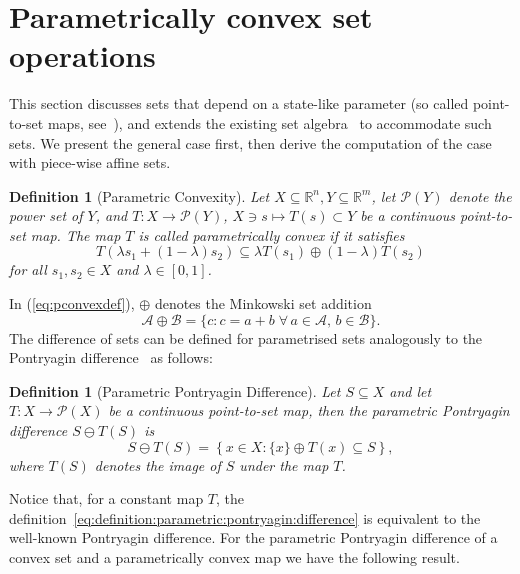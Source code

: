 \documentclass[letterpaper, 10pt, conference]{ieeeconf} %
\newtheorem{defn}[thm]{Definition}
\begin{document}
\section{Parametrically convex set operations}\label{sec:parametrically:convex:set:operations}
This section discusses sets that depend on a state-like parameter (so called point-to-set maps, 
see~\cite{Hogan:1973}), and extends the existing set algebra~\cite{blanchini:2007} to 
accommodate such sets. We present the general case first, then derive the computation of
the case with piece-wise affine sets.
%
%
    \begin{defn}[Parametric Convexity]\label{def:parametric:convexity}
      Let $X\subseteq\mathbb R^n, Y\subseteq\mathbb R^m$, let $\mathcal P(Y)$ denote the power set of $Y$, 
      and $T:X\rightarrow \mathcal P(Y)$, $X\ni s\mapsto T(s)\subset Y$ be a 
      continuous point-to-set map. The map $T$ is called \emph{parametrically convex} if it satisfies
      \begin{equation}\label{eq:pconvexdef}
        T(\lambda s_1 + (1-\lambda)s_2)\subseteq\lambda T(s_1) \oplus (1-\lambda) T(s_2)
      \end{equation}
      for all $s_1,s_2\in X$ and $\lambda\in[0,1]$.
    \end{defn}
%
In (\ref{eq:pconvexdef}), $\oplus$ denotes the Minkowski set addition
      \begin{equation}
        \mathcal A\oplus\mathcal B = \{c : c = a + b\; \forall\,a\in\mathcal A,\, b\in\mathcal B\}.
      \end{equation}
%
The difference of sets can be defined for parametrised sets analogously to the Pontryagin difference~\cite{Kolmanovsky:1998} as follows:
%
    \begin{defn}[Parametric Pontryagin Difference]\label{def:parametric:pontryagin:difference}
Let $S\subseteq X$ and let $T:X\to\mathcal P(X)$ be a continuous point-to-set map,
then the \emph{parametric Pontryagin difference} $S\ominus T(S)$ is 
      \begin{equation}\label{eq:definition:parametric:pontryagin:difference}
        S\ominus T(S) = \left\{x\in X: \{x\} \oplus T(x)\subseteq S\right\},
      \end{equation}
      where $T(S)$ denotes the image of $S$ under the map $T$. 
    \end{defn}
%
    Notice that, for a constant map $T$, the definition~\eqref{eq:definition:parametric:pontryagin:difference} is equivalent to the 
    well-known Pontryagin difference.
    For the parametric Pontryagin difference of a convex set and a parametrically convex map we have the following result.
\end{document}
